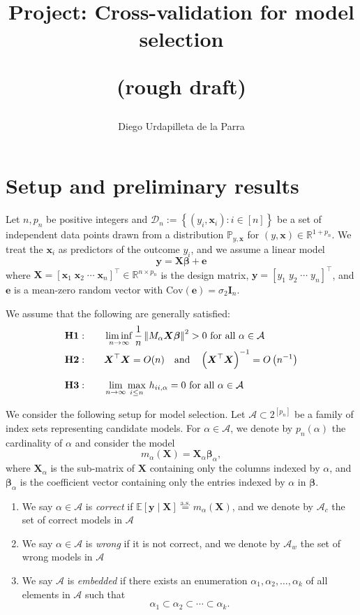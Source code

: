 \documentclass[12pt, letter paper]{article}
\title{Project: Cross-validation for model selection

(rough draft)}
\author{Diego Urdapilleta de la Parra}
\newcommand{\1}{\mathmybb{1}}
\newcommand{\R}{\mathbb{R}}
\newcommand{\0}{\emptyset}
\newcommand{\prob}{\mathbb{P}}
\newcommand{\Ep}[1]{\mathbb{E}\left[ #1 \right]}
\newcommand{\paren}[1]{\left(#1 \right)}
\newcommand{\sqbr}[1]{\left[#1 \right]}
\newcommand{\set}[1]{\left\{ #1 \right\}}
\newcommand{\norm}[1]{\left|\hspace{-1pt}\left|#1 \right|\hspace{-1pt}\right|}
\newcommand{\normsq}[1]{\norm{#1}^{2}}
\newcommand{\data}{\mathcal{D}_{n}}
\newcommand{\Acal}{\mathcal{A}}
\newcommand{\aseq}{\stackrel{\mathrm{a.s.}}{=}}
\newcommand{\X}{\boldsymbol{X}}
\newcommand{\x}{\boldsymbol{x}}
\newcommand{\y}{\boldsymbol{y}}
\newcommand{\e}{\boldsymbol{e}}
\newcommand{\Cov}[1]{\mathrm{Cov}\paren{#1}}
\newcommand{\bbeta}{\boldsymbol{\beta}}
\begin{document}
\maketitle
\section{Setup and preliminary results}
Let \(n,p_{n}\) be positive integers and \(\data := \set{\paren{y_{i}, \x_{i}}:i\in [n]}\) be a set of independent data points drawn from a distribution \(\prob_{y, \x}\) for \((y, \x)\in\R^{1+p_{n}}\). We treat the \(\x_{i}\) as predictors of the outcome \(y_{i}\), and we assume a linear model
\[\y = \X\bbeta + \e\]
where \(\X = {[\x_{1}\;\x_{2}\;\cdots\;\x_{n}]}^{\top}\in\R^{n\times p_{n}}\) is the design matrix, \(\y = \sqbr{y_{1}\; y_{2}\;\cdots\; y_{n}}^{\top}\), and \(\e\) is a mean-zero random vector with \(\Cov{\e} = \sigma_{2}\boldsymbol{I}_{n}\).

\begin{tcolorbox}[title=Assumptions, fonttitle=\bfseries]
    We assume that the following are generally satisfied:
    \begin{align*}
        &\mathbf{H1:}\qquad \liminf_{n\to\infty} \frac{1}{n}\normsq{M_{\alpha}\X\bbeta}>0 \text{ for all }\alpha \in\Acal\\
        &\mathbf{H2:} \qquad \X^{\top}\X = O(n)\quad\text{and}\quad\paren{\X^{\top}\X}^{-1}= O\paren{n^{-1}}\\[2.5mm]
        &\mathbf{H3:}\qquad \lim_{n\to\infty}\max_{i\leq n}\,h_{ii,\alpha} = 0 \text{ for all }\alpha \in\Acal\\
    \end{align*}
\end{tcolorbox}

We consider the following setup for model selection. Let \(\Acal\subset2^{[p_{n}]}\) be a family of index sets representing candidate models. For \(\alpha\in\Acal\), we denote by \(p_{n}(\alpha)\) the cardinality of \(\alpha\) and consider the model
\[m_{\alpha}(\X) = \X_{\alpha}\bbeta_{\alpha},\]
where \(\X_{\alpha}\) is the sub-matrix of \(\X\) containing only the columns indexed by \(\alpha\), and \(\bbeta_{\alpha}\) is the coefficient vector containing only the entries indexed by \(\alpha\) in \(\bbeta\).
\begin{enumerate}
    \item We say \(\alpha\in\Acal\) is \emph{correct} if \(\Ep{\y\mid\X}\aseq m_{\alpha}(\X)\), and we denote by \(\Acal_{c}\) the set of correct models in \(\Acal\)
    \item We say \(\alpha\in\Acal\) is \emph{wrong} if it is not correct, and we denote by \(\Acal_{w}\) the set of wrong models in \(\Acal\)
    \item We say \(\Acal\) is \emph{embedded} if there exists an enumeration \(\alpha_{1}, \alpha_{2}, \ldots, \alpha_{k}\) of all elements in \(\Acal\) such that \[\alpha_{1}\subset\alpha_{2}\subset\cdots\subset\alpha_{k}.\]
\end{enumerate}
\end{document}
